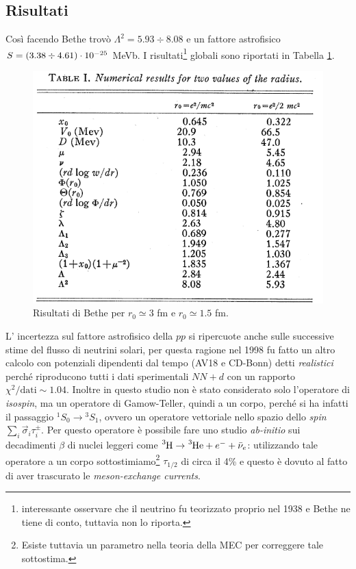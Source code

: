 \subsection{Risultati}
Così facendo Bethe trovò $\Lambda^2 = 5.93 \div 8.08 $ e un fattore astrofisico $S = ( 3.38 \div 4.61 )\cdot10^{-25}$ MeVb. I risultati\footnote{ interessante osservare che il neutrino fu teorizzato proprio nel 1938 e Bethe ne tiene di conto, tuttavia non lo riporta.} globali sono riportati in Tabella \ref{0331_tab}.
\begin{figure}[h]
    \centering
    \includegraphics*[scale=0.5]{Immagini/0331_Bethetab.png}
    \caption{Risultati di Bethe per $r_0 \simeq  3$ fm e $r_0 \simeq 1.5$ fm.}
    \label{0331_tab}
\end{figure}
\newline
\noindent L' incertezza sul fattore astrofisico della $pp$ si ripercuote anche sulle successive stime del flusso di neutrini solari, per questa ragione nel 1998 fu fatto un altro calcolo con potenziali dipendenti dal tempo (AV18 e CD-Bonn) detti \textit{realistici} perché riproducono tutti i dati sperimentali $NN + d$ con un rapporto $\chi^2/\text{dati}\sim 1.04$.
Inoltre in questo studio non è stato considerato solo l'operatore di \textit{isospin}, ma un operatore di Gamow-Teller, quindi a un corpo, perché si ha infatti il passaggio ${^1S_0} \to {^3S_1}$, ovvero un operatore vettoriale nello spazio dello \textit{spin} $\sum_i \vec{\sigma}_i \tau^\pm_i$. Per questo operatore è possibile fare uno studio \textit{ab-initio} sui decadimenti $\beta$ di nuclei leggeri come $\ce{^3H}\to\ce{^3He} +e^- + \bar{\nu}_e$: utilizzando tale operatore a un corpo sottostimiamo\footnote{Esiste tuttavia un parametro nella teoria della MEC per correggere tale sottostima.} $\tau_{1/2}$ di circa il 4\% e questo è dovuto al fatto di aver trascurato le \textit{meson-exchange currents}.
